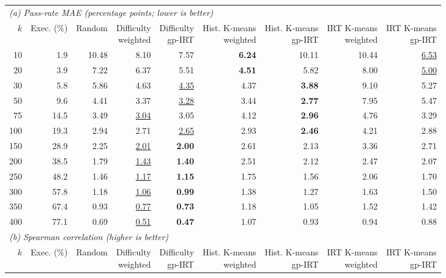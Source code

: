 \begin{table}[t]
  \centering
  \scriptsize
  \setlength{\tabcolsep}{2.4pt}
  \begin{tabular}{rrrrrrrrr}
    \toprule
    \multicolumn{9}{l}{\textit{(a) Pass-rate MAE (percentage points; lower is better)}} \\
    $k$ & Exec. (\%) & Random & \shortstack{Difficulty\\weighted} & \shortstack{Difficulty\\gp-IRT} & \shortstack{Hist. K-means\\weighted} & \shortstack{Hist. K-means\\gp-IRT} & \shortstack{IRT K-means\\weighted} & \shortstack{IRT K-means\\gp-IRT} \\
    \midrule
    10 & 1.9 & 10.48 & 8.10 & 7.57 & \textbf{6.24} & 10.11 & 10.44 & \underline{6.53} \\
    20 & 3.9 & 7.22 & 6.37 & 5.51 & \textbf{4.51} & 5.82 & 8.00 & \underline{5.00} \\
    30 & 5.8 & 5.86 & 4.63 & \underline{4.35} & 4.37 & \textbf{3.88} & 9.10 & 5.27 \\
    50 & 9.6 & 4.41 & 3.37 & \underline{3.28} & 3.44 & \textbf{2.77} & 7.95 & 5.47 \\
    75 & 14.5 & 3.49 & \underline{3.04} & 3.05 & 4.12 & \textbf{2.96} & 4.76 & 3.29 \\
    100 & 19.3 & 2.94 & 2.71 & \underline{2.65} & 2.93 & \textbf{2.46} & 4.21 & 2.88 \\
    150 & 28.9 & 2.25 & \underline{2.01} & \textbf{2.00} & 2.61 & 2.13 & 3.36 & 2.71 \\
    200 & 38.5 & 1.79 & \underline{1.43} & \textbf{1.40} & 2.51 & 2.12 & 2.47 & 2.07 \\
    250 & 48.2 & 1.46 & \underline{1.17} & \textbf{1.15} & 1.75 & 1.56 & 2.06 & 1.70 \\
    300 & 57.8 & 1.18 & \underline{1.06} & \textbf{0.99} & 1.38 & 1.27 & 1.63 & 1.50 \\
    350 & 67.4 & 0.93 & \underline{0.77} & \textbf{0.73} & 1.18 & 1.05 & 1.52 & 1.42 \\
    400 & 77.1 & 0.69 & \underline{0.51} & \textbf{0.47} & 1.07 & 0.93 & 0.94 & 0.88 \\
    \midrule
    \multicolumn{9}{l}{\textit{(b) Spearman correlation (higher is better)}} \\
    $k$ & Exec. (\%) & Random & \shortstack{Difficulty\\weighted} & \shortstack{Difficulty\\gp-IRT} & \shortstack{Hist. K-means\\weighted} & \shortstack{Hist. K-means\\gp-IRT} & \shortstack{IRT K-means\\weighted} & \shortstack{IRT K-means\\gp-IRT} \\

\end{tabular}
\end{table}
